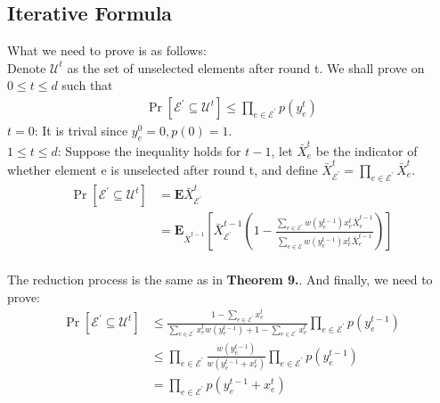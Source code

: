 \documentclass{article}
\begin{document}
\subsection{Iterative Formula}
What we need to prove is as follows:
\\
Denote $\mathcal{U}^{t}$ as the set of unselected elements after round t. We shall prove on $0 \leq t \leq d$ such that
\begin{equation*}
\begin{aligned}
\operatorname{Pr}\left[\mathcal{E}^{\prime} \subseteq \mathcal{U}^{t}\right] \leq \prod_{e \in \mathcal{E}^{\prime}} p\left(y_{e}^{t}\right)
\end{aligned}
\end{equation*}
$t = 0$: It is trival since  $y_e^0=0, p(0)=1$.
\\
$1\leq t \leq d$: Suppose the inequality holds for $t -1$, let $\bar{X}_{e}^{t}$ be the indicator of whether element e is unselected after round t, and define $\bar{X}_{\mathcal{E}^{\prime}}^{t}=\prod_{e \in \mathcal{E}^{\prime}} \bar{X}_{e}^{t}$. 
\begin{equation*}
\begin{aligned} \operatorname{Pr}\left[\mathcal{E}^{\prime} \subseteq \mathcal{U}^{t}\right] &=\mathbf{E} \bar{X}_{\mathcal{E}^{\prime}}^{t} \\ &=\mathbf{E}_{\bar{X}^{t-1}}\left[\bar{X}_{\mathcal{E}^{\prime}}^{t-1}\left(1-\frac{\sum_{e \in \mathcal{E}^{\prime}} w\left(y_{e}^{t-1}\right) x_{e}^{t} \bar{X}_{e}^{t-1}}{\sum_{e \in \mathcal{E}} w\left(y_{e}^{t-1}\right) x_{e}^{t} \bar{X}_{e}^{t-1}}\right)\right] 
\end{aligned}
\end{equation*}
\\
The reduction process is the same as in \textbf{Theorem 9.}\cite{gao2021focs}. And finally, we need to prove:
\begin{equation*}
\begin{aligned}
 \operatorname{Pr}\left[\mathcal{E}^{\prime} \subseteq \mathcal{U}^{t}\right] & \leq \frac{1-\sum_{e \in \mathcal{E}^{\prime}} x_{e}^{t}}{\sum_{e \in \mathcal{E}^{\prime}} x_{e}^{t} w\left(y_{e}^{t-1}\right)+1-\sum_{e \in \mathcal{E}^{\prime}} x_{e}^{t}} \prod_{e \in \mathcal{E}^{\prime}} p\left(y_{e}^{t-1}\right) \\ & \leq \prod_{e \in \mathcal{E}^{\prime}} \frac{w\left(y_{e}^{t-1}\right)}{w\left(y_{e}^{t-1}+x_{e}^{t}\right)} \prod_{e \in \mathcal{E}^{\prime}} p\left(y_{e}^{t-1}\right)
 \\&=\prod_{e \in \mathcal{E}^{\prime}} p\left(y_{e}^{t-1}+x_{e}^{t}\right)
 \end{aligned}
\end{equation*}
\end{document}
